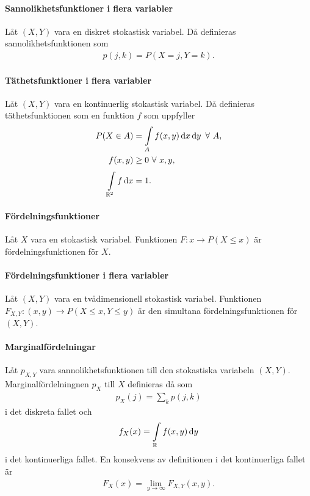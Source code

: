 \paragraph{Sannolikhetsfunktioner i flera variabler}
Låt $(X, Y)$ vara en diskret stokastisk variabel. Då definieras sannolikhetsfunktionen som
\begin{align*}
	p(j, k) = P(X = j, Y = k).
\end{align*}

\paragraph{Täthetsfunktioner i flera variabler}
Låt $(X, Y)$ vara en kontinuerlig stokastisk variabel. Då definieras täthetsfunktionen som en funktion $f$ som uppfyller
\begin{align*}
	P(X\in A)            &= \int\limits_{A}f(x, y)\dd{x}\dd{y}\ \forall\ A, \\
	f(x, y)              &\geq 0\ \forall\ x, y, \\
	\integ{\R^2}{}{f}{x} &= 1.
\end{align*}

\paragraph{Fördelningsfunktioner}
Låt $X$ vara en stokastisk variabel. Funktionen $F: x\to P(X\leq x)$ är fördelningsfunktionen för $X$.

\paragraph{Fördelningsfunktioner i flera variabler}
Låt $(X, Y)$ vara en tvådimensionell stokastisk variabel. Funktionen $F_{X, Y}: (x, y)\to P(X\leq x, Y\leq y)$ är den simultana fördelningsfunktionen för $(X, Y)$.

\paragraph{Marginalfördelningar}
Låt $p_{X, Y}$ vara sannolikhetsfunktionen till den stokastiska variabeln $(X, Y)$. Marginalfördelningnen $p_{X}$ till $X$ definieras då som
\begin{align*}
	p_{X}(j) = \sum\limits_{k}p(j, k)
\end{align*}
i det diskreta fallet och
\begin{align*}
	f_{X}(x) = \int\limits_{\mathbb{R}}f(x, y)\dd{y}
\end{align*}
i det kontinuerliga fallet. En konsekvens av definitionen i det kontinuerliga fallet är
\begin{align*}
	F_{X}(x) = \lim\limits_{y\to\infty}F_{X, Y}(x, y).
\end{align*}

